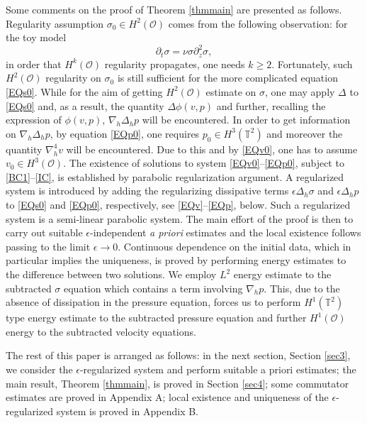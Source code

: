 \documentclass[12pt,reqno]{amsart}
\numberwithin{equation}{section}
\begin{document}
Some comments on the proof of Theorem \ref{thmmain} are presented as follows.
Regularity assumption $\sigma_0\in H^2(\mathcal O)$ comes from the following observation: for the toy model
$$
\partial_t\sigma=\nu\sigma\partial_z^2\sigma,
$$
in order that $H^k(\mathcal O)$ regularity propagates, one needs $k\geq2$.
Fortunately, such $H^2(\mathcal O)$ regularity on $\sigma_0$ is still sufficient for the more complicated equation \eqref{EQs0}.
While for the aim of getting $H^2(\mathcal O)$ estimate on $\sigma$, one may apply $\Delta$ to \eqref{EQs0} and, as a result, the
quantity $\Delta\phi(v,p)$ and further, recalling the expression of $\phi(v,p)$, $\nabla_h\Delta_hp$ will be encountered.
In order to get information on $\nabla_h\Delta_hp$, by equation \eqref{EQp0}, one requires $p_0\in H^3(\mathbb T^2)$ and moreover
the quantity $\nabla_h^4v$ will be encountered. Due to this and by \eqref{EQv0}, one has to assume $v_0\in H^3(\mathcal O)$.
The existence of solutions to system \eqref{EQv0}--\eqref{EQp0}, subject to \eqref{BC1}--\eqref{IC}, is established by parabolic
regularization argument. A regularized system is introduced by adding the regularizing dissipative terms $\epsilon\Delta_h\sigma$ and $\epsilon\Delta_hp$
to \eqref{EQs0} and \eqref{EQp0}, respectively, see \eqref{EQv}--\eqref{EQp}, below. Such a regularized system is a semi-linear
parabolic system. The main effort of the proof is then to carry out
suitable $\epsilon$-independent {\it a priori} estimates and the local existence
follows passing to the limit $\epsilon\rightarrow0$.
Continuous dependence on the initial data, which in particular implies
the uniqueness, is proved by performing energy estimates to the difference between two solutions. We employ $L^2$ energy estimate to the
subtracted $\sigma$ equation which contains a term involving $\nabla_hp$. This, due to the absence of dissipation
in the pressure equation, forces us to perform $H^1(\mathbb T^2)$ type energy estimate to the subtracted pressure equation and
further $H^1(\mathcal O)$ energy to the subtracted velocity equations.

The rest of this paper is arranged as follows: in the next section, Section \ref{sec3}, we consider the $\epsilon$-regularized system
and perform suitable a priori estimates; the main result, Theorem \ref{thmmain}, is proved in Section \ref{sec4}; some commutator estimates are proved in Appendix A; local existence and uniqueness of the $\epsilon$-regularized system is proved in Appendix B.
\end{document}
